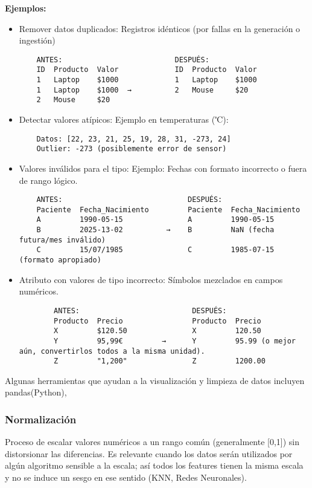 \documentclass[12pt]{book}
\begin{document}
\textbf{Ejemplos:} 
\begin{itemize}
    \item Remover datos duplicados: Registros idénticos (por fallas en la generación o ingestión)
    \begin{verbatim}
    ANTES:                          DESPUÉS:
    ID  Producto  Valor             ID  Producto  Valor
    1   Laptop    $1000             1   Laptop    $1000
    1   Laptop    $1000  →          2   Mouse     $20
    2   Mouse     $20
    \end{verbatim}

    \item Detectar valores atípicos: Ejemplo en temperaturas (℃):
    \begin{verbatim}
    Datos: [22, 23, 21, 25, 19, 28, 31, -273, 24]
    Outlier: -273 (posiblemente error de sensor) 
    \end{verbatim} %
    
    \item Valores inválidos para el tipo: Ejemplo: Fechas con formato incorrecto o fuera de rango lógico.
    \begin{verbatim}
    ANTES:                             DESPUÉS:
    Paciente  Fecha_Nacimiento         Paciente  Fecha_Nacimiento
    A         1990-05-15               A         1990-05-15
    B         2025-13-02          →    B         NaN (fecha futura/mes inválido)
    C         15/07/1985               C         1985-07-15 (formato apropiado)
    \end{verbatim}
    
    \item Atributo con valores de tipo incorrecto: Símbolos mezclados en campos numéricos.
    \begin{verbatim}
        ANTES:                          DESPUÉS:
        Producto  Precio                Producto  Precio
        X         $120.50               X         120.50
        Y         95,99€         →      Y         95.99 (o mejor aún, convertirlos todos a la misma unidad).
        Z         "1,200"               Z         1200.00
    \end{verbatim}
\end{itemize}
Algunas herramientas que ayudan a la visualización y limpieza de datos incluyen pandas(Python), 

\subsubsection{Normalización}
Proceso de escalar valores numéricos a un rango común (generalmente [0,1]) sin distorsionar las diferencias. Es 
relevante cuando los datos serán utilizados por algún algoritmo sensible a la escala; así todos los features tienen 
la misma escala y no se induce un sesgo en ese sentido (KNN, Redes Neuronales).\\
\end{document}
